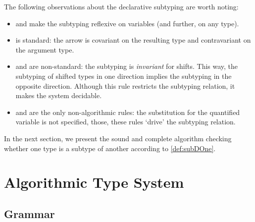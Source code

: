 \documentclass[acmsmall,natbib=false,review,anonymous]{acmart}
\begin{document}
\begin{definition} 
  \label{def:subDOne}
  \hfill
  
  \begin{multicols}{2}
    \ottdefnDOneNsubLabeled{}

    \ottdefnDOnePsupLabeled{}
  \end{multicols}
  \hfill

  \begin{multicols}{2}
    \ottdefnDOneNeqLabeled{}

    \ottdefnDOnePeqLabeled{}
  \end{multicols}
\end{definition}

The following observations about the declarative subtyping are worth noting:
\begin{itemize}
  \item {} and 
    make the subtyping reflexive on variables (and further, on any type).
  \item {} is standard: the arrow is covariant on the
    resulting type and contravariant on the argument type.
  \item {}  and  are non-standard:
    the subtyping is \emph{invariant} for shifts. 
    This way, the subtyping of shifted types in one direction implies the subtyping
    in the opposite direction.
    Although this rule restricts the
    subtyping relation, it makes the system decidable.
  \item {} and  are the only
    non-algorithmic rules: the substitution for the quantified variable is
    not specified, those, these rules `drive' the subtyping relation.
\end{itemize}

In the next section, we present the sound and complete algorithm
checking whether one type is a subtype of another according to \cref{def:subDOne}. 

\section{Algorithmic Type System}

\subsection{Grammar}
\end{document}
